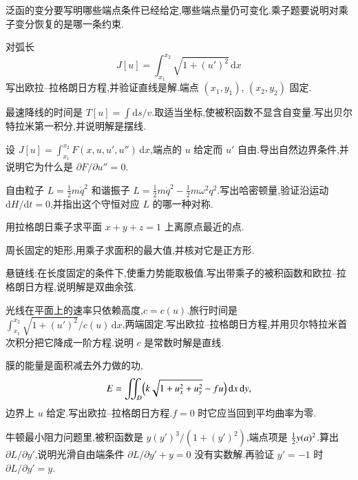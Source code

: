 泛函的变分要写明哪些端点条件已经给定,哪些端点量仍可变化.乘子题要说明对乘子变分恢复的是哪一条约束.

\begin{problemset}
\renewcommand{\theenumi}{\thechapter.\arabic{enumi}}
\renewcommand{\labelenumi}{\theenumi.}
\item 对弧长
\begin{equation*}
  J[u]=\int_{x_1}^{x_2}\sqrt{1+(u')^2}\,\mathrm{d}x
\end{equation*}
写出欧拉--拉格朗日方程,并验证直线是解.端点 $(x_1,y_1)$, $(x_2,y_2)$ 固定.

\item 最速降线的时间是 $T[u]=\int\mathrm{d}s/v$.取适当坐标,使被积函数不显含自变量.写出贝尔特拉米第一积分,并说明解是摆线.

\item 设 $J[u]=\int_{x_1}^{x_2}F(x,u,u',u'')\,\mathrm{d}x$,端点的 $u$ 给定而 $u'$ 自由.导出自然边界条件,并说明它为什么是 $\partial F/\partial u''=0$.

\item 自由粒子 $L=\frac12 m\dot q^2$ 和谐振子 $L=\frac12 m\dot q^2-\frac12 m\omega^2 q^2$.写出哈密顿量,验证沿运动 $\mathrm{d}H/\mathrm{d}t=0$,并指出这个守恒对应 $L$ 的哪一种对称.

\item 用拉格朗日乘子求平面 $x+y+z=1$ 上离原点最近的点.

\item 周长固定的矩形,用乘子求面积的最大值,并核对它是正方形.

\item 悬链线:在长度固定的条件下,使重力势能取极值.写出带乘子的被积函数和欧拉--拉格朗日方程,说明解是双曲余弦.

\item 光线在平面上的速率只依赖高度,$c=c(u)$.旅行时间是 $\int_{x_1}^{x_2}\sqrt{1+(u')^2}/c(u)\,\mathrm{d}x$,两端固定.写出欧拉--拉格朗日方程,并用贝尔特拉米首次积分把它降成一阶方程.说明 $c$ 是常数时解是直线.

\item 膜的能量是面积减去外力做的功,
\begin{equation*}
  E=\iint_D\Bigl(k\sqrt{1+u_x^2+u_y^2}-fu\Bigr)\,\mathrm{d}x\,\mathrm{d}y,
\end{equation*}
边界上 $u$ 给定.写出欧拉--拉格朗日方程.$f=0$ 时它应当回到平均曲率为零.

\item 牛顿最小阻力问题里,被积函数是 $y(y')^3/(1+(y')^2)$,端点项是 ${\frac{1}{2}} y(a)^2$.算出 $\partial L/\partial y'$,说明光滑自由端条件 $\partial L/\partial y'+y=0$ 没有实数解.再验证 $y'=-1$ 时 $\partial L/\partial y'=y$.


\end{problemset}
